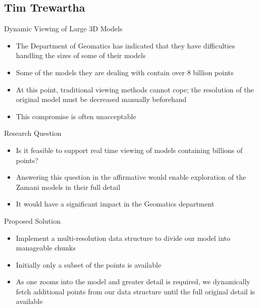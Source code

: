 \documentclass{beamer}
\begin{document}
\subsection{Tim Trewartha}
\begin{frame}{Dynamic Viewing of Large 3D Models}
\begin{itemize}
\item The Department of Geomatics has indicated that they have difficulties
  handling the sizes of some of their models
\item Some of the models they are dealing with contain over 8 billion points
\item At this point, traditional viewing methods cannot cope; the resolution
  of the original model must be decreased manually beforehand
\item This compromise is often unacceptable
\end{itemize}
\end{frame}


\begin{frame}{Research Question}
\begin{itemize}
\item Is it feasible to support real time viewing of models containing
  billions of points?
\item Answering this question in the affirmative would enable exploration
  of the Zamani models in their full detail
\item It would have a significant impact in the Geomatics department
\end{itemize}
\end{frame}

\begin{frame}{Proposed Solution}

\begin{itemize}
\item Implement a multi-resolution data structure to divide our model into
  manageable chunks
\item Initially only a subset of the points is available
\item As one zooms into the model and greater detail is required, we dynamically
  fetch additional points from our data structure until the full original
  detail is available
\end{itemize}
\end{frame}
\end{document}
